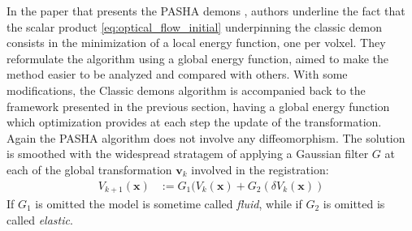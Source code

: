 In the paper that presents the PASHA demons \cite{cachier2003iconic}, authors underline the fact that the scalar product \ref{eq:optical_flow_initial} underpinning the classic demon consists in the minimization of a local energy function, one per volxel. They reformulate the algorithm using a global energy function, aimed to make the method easier to be analyzed and compared with others. With some modifications, the Classic demons algorithm is accompanied back to the framework presented in the previous section, having a global energy function which optimization provides at each step the update of the transformation. \\
%
Again the PASHA algorithm does not involve any diffeomorphism. The solution is smoothed with the widespread stratagem of applying a Gaussian filter $G$ at each of the global transformation $\mathbf{v}_{k}$ involved in the registration:
\begin{align*}
V_{k+1}(\mathbf{x})  &:= G_{1}(V_{k}(\mathbf{x}) + G_{2}(\delta V_{k}(\mathbf{x}))
\end{align*}
If $G_{1}$ is omitted the model is sometime called \emph{fluid}, while if $G_{2}$ is omitted is called \emph{elastic}.\\

